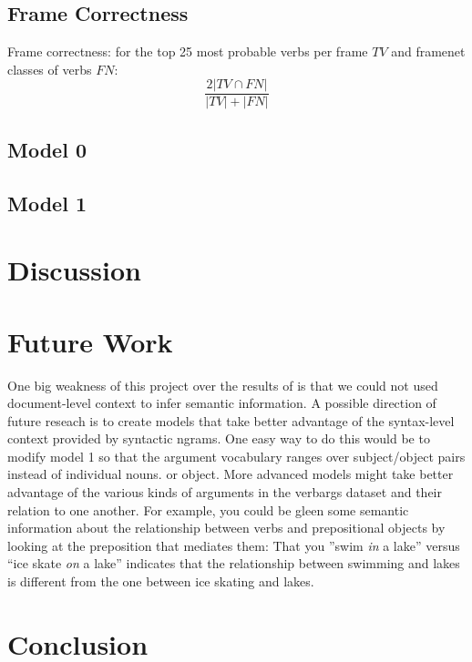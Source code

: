 \documentclass[11pt,twocolumn,DIV=11]{scrartcl}
\begin{document}
\subsection{Frame Correctness}

Frame correctness: for the top 25 most probable verbs per frame $TV$ and framenet classes of verbs $FN$: \[\frac{2|TV\cap FN|}{|TV|+|FN|}\]

\subsection{Model 0}
\subsection{Model 1}


\section{Discussion}


\section{Future Work}
One big weakness of this project over the results of \citet{oconnor2013} is that 
we could not used document-level context to infer semantic information.
A possible direction of future reseach is to create models that take better 
advantage of the syntax-level context provided by syntactic ngrams. 
One easy way to do this would be to modify model 1 so that the argument 
vocabulary ranges over subject/object pairs instead of individual nouns.
or object.
More advanced models might take better advantage of the various kinds of arguments
in the verbargs dataset and their relation to one another.
For example, you could be gleen some semantic information about the relationship between
verbs and prepositional objects by looking at the preposition that mediates them: 
That you ''swim \emph{in} a lake'' versus ``ice skate \emph{on} a lake'' 
indicates that the relationship between swimming and lakes is different from the one between
ice skating and lakes.

\section{Conclusion}



\end{document}
